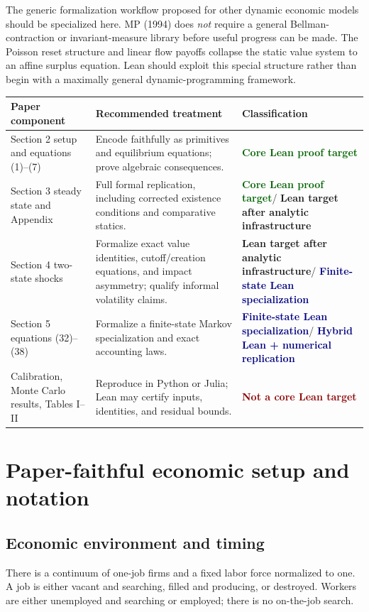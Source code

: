\documentclass[11pt]{article}
\newcommand{\core}{\textcolor{darkGreen}{\textbf{Core Lean proof target}}}
\newcommand{\infra}{\textcolor{darkAmber}{\textbf{Lean target after analytic infrastructure}}}
\newcommand{\finite}{\textcolor{navy}{\textbf{Finite-state Lean specialization}}}
\newcommand{\hybrid}{\textcolor{navy}{\textbf{Hybrid Lean + numerical replication}}}
\newcommand{\outside}{\textcolor{darkRed}{\textbf{Not a core Lean target}}}
\begin{document}
The generic formalization workflow proposed for other dynamic economic models should be specialized here. MP (1994) does \emph{not} require a general Bellman-contraction or invariant-measure library before useful progress can be made. The Poisson reset structure and linear flow payoffs collapse the static value system to an affine surplus equation. Lean should exploit this special structure rather than begin with a maximally general dynamic-programming framework.

\begin{center}
\small
\begin{tabularx}{0.95\textwidth}{@{}p{}X p{}@{}}
\toprule
Paper component & Recommended treatment & Classification \\
\midrule
Section 2 setup and equations (1)--(7) & Encode faithfully as primitives and equilibrium equations; prove algebraic consequences. & \core \\
Section 3 steady state and Appendix & Full formal replication, including corrected existence conditions and comparative statics. & \core / \infra \\
Section 4 two-state shocks & Formalize exact value identities, cutoff/creation equations, and impact asymmetry; qualify informal volatility claims. & \infra / \finite \\
Section 5 equations (32)--(38) & Formalize a finite-state Markov specialization and exact accounting laws. & \finite / \hybrid \\
Calibration, Monte Carlo results, Tables I--II & Reproduce in Python or Julia; Lean may certify inputs, identities, and residual bounds. & \outside \\
\bottomrule
\end{tabularx}
\end{center}

\newpage
\section{Paper-faithful economic setup and notation}

\subsection{Economic environment and timing}

There is a continuum of one-job firms and a fixed labor force normalized to one. A job is either vacant and searching, filled and producing, or destroyed. Workers are either unemployed and searching or employed; there is no on-the-job search.
\end{document}
